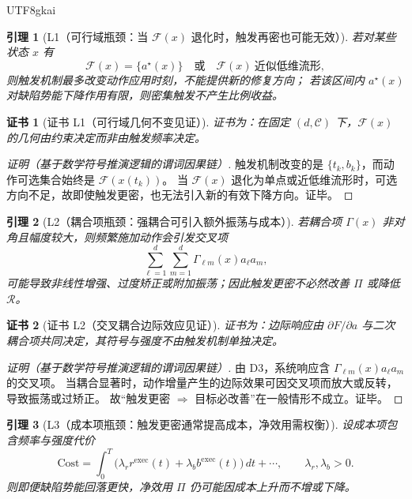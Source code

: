 \documentclass[12pt]{article}
\newtheorem{lemma}{引理}[section]
\newtheorem{Certificate}{证书}[section]
\begin{document}
\begin{CJK*}{UTF8}{gkai}
\begin{lemma}[L1（可行域瓶颈：当 $\mathcal{F}(x)$ 退化时，触发再密也可能无效）]
\label{lem:tex28-ch6-l1}
若对某些状态 $x$ 有
\[
  \mathcal{F}(x)=\{a^{\star}(x)\}
  \quad\text{或}\quad
  \mathcal{F}(x)\ \text{近似低维流形},
\]
则触发机制最多改变动作应用时刻，不能提供新的修复方向；
若该区间内 $a^{\star}(x)$ 对缺陷势能下降作用有限，则密集触发不产生比例收益。
\end{lemma}

\begin{Certificate}[证书 L1（可行域几何不变见证）]
\label{cert:tex28-ch6-l1}
证书为：在固定 $(d,\mathcal{C})$ 下，$\mathcal{F}(x)$ 的几何由约束决定而非由触发频率决定。
\end{Certificate}

\begin{proof}[证明（基于数学符号推演逻辑的谓词因果链）]
触发机制改变的是 $\{t_k,b_k\}$，而动作可选集合始终是 $\mathcal{F}(x(t_k))$。
当 $\mathcal{F}(x)$ 退化为单点或近低维流形时，可选方向不足，故即使触发更密，也无法引入新的有效下降方向。证毕。
\end{proof}

\begin{lemma}[L2（耦合项瓶颈：强耦合可引入额外振荡与成本）]
\label{lem:tex28-ch6-l2}
若耦合项 $\Gamma(x)$ 非对角且幅度较大，则频繁施加动作会引发交叉项
\[
  \sum_{\ell=1}^{d}\sum_{m=1}^{d}\Gamma_{\ell m}(x)a_\ell a_m,
\]
可能导致非线性增强、过度矫正或附加振荡；因此触发更密不必然改善 $\Pi$ 或降低 $\mathcal{R}$。
\end{lemma}

\begin{Certificate}[证书 L2（交叉耦合边际效应见证）]
\label{cert:tex28-ch6-l2}
证书为：边际响应由 $\partial F/\partial a$ 与二次耦合项共同决定，其符号与强度不由触发机制单独决定。
\end{Certificate}

\begin{proof}[证明（基于数学符号推演逻辑的谓词因果链）]
由 D3，系统响应含 $\Gamma_{\ell m}(x)a_\ell a_m$ 的交叉项。
当耦合显著时，动作增量产生的边际效果可因交叉项而放大或反转，导致振荡或过矫正。
故“触发更密 $\Rightarrow$ 目标必改善”在一般情形不成立。证毕。
\end{proof}

\begin{lemma}[L3（成本项瓶颈：触发更密通常提高成本，净效用需权衡）]
\label{lem:tex28-ch6-l3}
设成本项包含频率与强度代价
\[
  \mathrm{Cost}
  = \int_{0}^{T}\!\bigl(\lambda_r r^{\mathrm{exec}}(t)+\lambda_b b^{\mathrm{exec}}(t)\bigr)\,dt+\cdots,
  \qquad
  \lambda_r,\lambda_b>0.
\]
则即便缺陷势能回落更快，净效用 $\Pi$ 仍可能因成本上升而不增或下降。
\end{lemma}


\end{CJK*}
\end{document}
